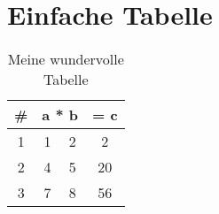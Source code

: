 \section{Einfache Tabelle}
\begin{table}[ht]
\centering
\begin{tabular}{|c||c|c|c|}	
	\hline
	\# 	& \multicolumn{2}{|c|}{a * b}	&	= c	\\
	
	\hline
	1	&	1	&	2	&	2	\\
	
	\hline
	2	&	4 	&	5	&	20	\\
	
	\hline
	3	&	7 	&	8	&	56	\\
	
	\hline
\end{tabular}

\caption{Meine wundervolle Tabelle}
\end{table}